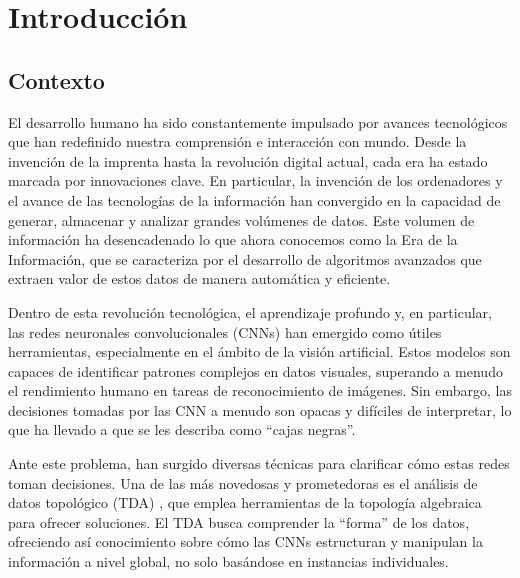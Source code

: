 %


\chapter{Introducción}

\section{Contexto}

El desarrollo humano ha sido constantemente impulsado por avances tecnológicos que
han redefinido nuestra comprensión e interacción con mundo. Desde la invención
de la imprenta hasta la revolución digital actual, cada era ha estado marcada por
innovaciones clave. En particular, la invención de los ordenadores y el avance de
las tecnologías de la información han convergido en la capacidad de generar,
almacenar y analizar grandes volúmenes de datos. Este volumen de información ha desencadenado
lo que ahora conocemos como la Era de la Información, que se caracteriza por el
desarrollo de algoritmos avanzados que extraen valor de estos datos de manera
automática y eficiente.

Dentro de esta revolución tecnológica, el aprendizaje profundo y, en particular,
las redes neuronales convolucionales (CNNs) \cite{bengio2017deep} han emergido como
útiles herramientas, especialmente en el ámbito de la visión artificial. Estos modelos
son capaces de identificar patrones complejos en datos visuales, superando a
menudo el rendimiento humano en tareas de reconocimiento de imágenes. Sin embargo,
las decisiones tomadas por las CNN a menudo son opacas y difíciles de
interpretar, lo que ha llevado a que se les describa como \enquote{cajas negras}.

Ante este problema, han surgido diversas técnicas para clarificar cómo estas redes
toman decisiones. Una de las más novedosas y prometedoras es el análisis de
datos topológico (TDA) \cite{dey2022computational}, que emplea herramientas de la
topología algebraica para ofrecer soluciones. El TDA busca comprender la
\enquote{forma} de los datos, ofreciendo así conocimiento sobre cómo las CNNs
estructuran y manipulan la información a nivel global, no solo basándose en instancias
individuales.

